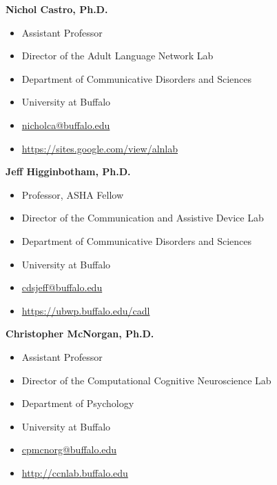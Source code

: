 \documentclass[11pt]{article}
\begin{document}
\vspace{0.2cm}

\textbf{Nichol Castro, Ph.D.}

\begin{itemize}[leftmargin=!,labelindent=!]
    \item[] Assistant Professor
    \item[] Director of the Adult Language Network Lab
    \item[] Department of Communicative Disorders and Sciences
    \item[] University at Buffalo
    \item[] \href{mailto:nicholca@buffalo.edu}{nicholca@buffalo.edu}
    \item[] \url{https://sites.google.com/view/alnlab}
\end{itemize}

\vspace{0.2cm}

\textbf{Jeff Higginbotham, Ph.D.}

\begin{itemize}[leftmargin=!,labelindent=!]
    \item[] Professor, ASHA Fellow
    \item[] Director of the Communication and Assistive Device Lab
    \item[] Department of Communicative Disorders and Sciences
    \item[] University at Buffalo
    \item[] \href{mailto:cdsjeff@buffalo.edu}{cdsjeff@buffalo.edu}
    \item[] \url{https://ubwp.buffalo.edu/cadl}
\end{itemize}

\vspace{0.2cm}

\textbf{Christopher McNorgan, Ph.D.}

\begin{itemize}[leftmargin=!,labelindent=!]
    \item[] Assistant Professor
    \item[] Director of the Computational Cognitive Neuroscience Lab
    \item[] Department of Psychology
    \item[] University at Buffalo
    \item[] \href{mailto:cpmcnorg@buffalo.edu}{cpmcnorg@buffalo.edu}
    \item[] \url{http://ccnlab.buffalo.edu}
\end{itemize}
\end{document}
